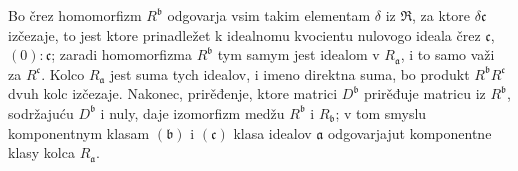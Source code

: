 \documentclass[11pt]{article}
\begin{document}
Bo črez homomorfizm $R^{\mathfrak b}$ odgovarja vsim takim elementam $\delta$ iz $\mathfrak R$, za ktore $\delta\mathfrak c$ izčezaje, to jest ktore prinadležet k idealnomu kvocientu nulovogo ideala črez $\mathfrak c$, $(0):\mathfrak c$; zaradi homomorfizma $R^{\mathfrak b}$ tym samym jest idealom v $R_{\mathfrak a}$, i to samo važi za $R^{\mathfrak c}$. Kolco $R_{\mathfrak a}$ jest suma tych idealov, i imeno direktna suma, bo produkt $R^{\mathfrak b}R^{\mathfrak c}$ dvuh kolc izčezaje. Nakonec, prirěđenje, ktore matrici $D^{\mathfrak b}$ prirěđuje matricu iz $R^{\mathfrak b}$, sodržajuću $D^{\mathfrak b}$ i nuly, daje izomorfizm medžu $R^{\mathfrak b}$ i $R_{\mathfrak b}$; v tom smyslu komponentnym klasam $(\mathfrak b)$ i $(\mathfrak c)$ klasa idealov $\mathfrak a$ odgovarjajut komponentne klasy kolca $R_{\mathfrak a}$.
\end{document}
